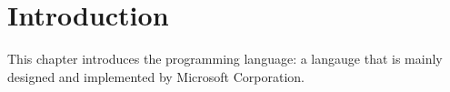 \documentclass[../main.tex]{subfiles}
\begin{document}
    \section{Introduction}
    This chapter introduces the \csharp programming language: a langauge that is
    mainly designed and implemented by Microsoft Corporation. 
\end{document}

